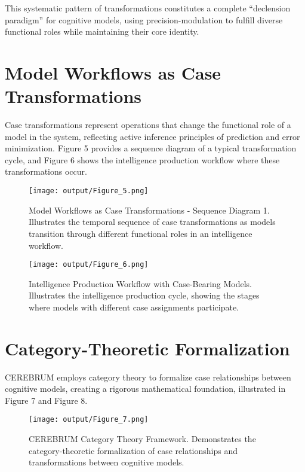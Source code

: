 This systematic pattern of transformations constitutes a complete
``declension paradigm'' for cognitive models, using precision-modulation
to fulfill diverse functional roles while maintaining their core
identity.

\hypertarget{model-workflows-as-case-transformations}{%
\section{Model Workflows as Case
Transformations}\label{model-workflows-as-case-transformations}}

Case transformations represent operations that change the functional
role of a model in the system, reflecting active inference principles of
prediction and error minimization. Figure 5 provides a sequence diagram
of a typical transformation cycle, and Figure 6 shows the intelligence
production workflow where these transformations occur.

\begin{figure}
\centering
\texttt{[image: output/Figure\_5.png]}
\caption{Model Workflows as Case Transformations - Sequence Diagram 1.
Illustrates the temporal sequence of case transformations as models
transition through different functional roles in an intelligence
workflow.}
\end{figure}

\begin{figure}
\centering
\texttt{[image: output/Figure\_6.png]}
\caption{Intelligence Production Workflow with Case-Bearing Models.
Illustrates the intelligence production cycle, showing the stages where
models with different case assignments participate.}
\end{figure}

\hypertarget{category-theoretic-formalization}{%
\section{Category-Theoretic
Formalization}\label{category-theoretic-formalization}}

CEREBRUM employs category theory to formalize case relationships between
cognitive models, creating a rigorous mathematical foundation,
illustrated in Figure 7 and Figure 8.

\begin{figure}
\centering
\texttt{[image: output/Figure\_7.png]}
\caption{CEREBRUM Category Theory Framework. Demonstrates the
category-theoretic formalization of case relationships and
transformations between cognitive models.}
\end{figure}

